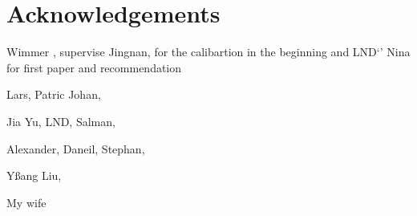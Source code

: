 \chapter*{Acknowledgements}



Wimmer , supervise
Jingnan, for the calibartion in the beginning and LND`'
Nina for first paper and recommendation


Lars, Patric
Johan, 

Jia Yu, LND, Salman, 

Alexander, Daneil, Stephan, 

Yßang Liu, 

My wife 







